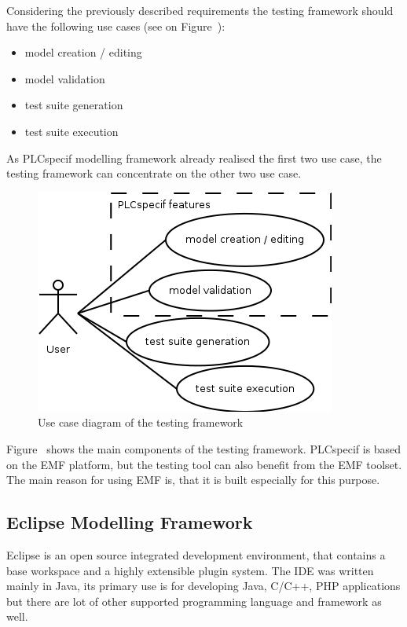 Considering the previously described requirements the testing framework should have the following use cases (see on Figure~\cite{fig:designuc}):

\begin{itemize}
	\item model creation / editing
	\item model validation
	\item test suite generation
	\item test suite execution
\end{itemize}

As PLCspecif modelling framework already realised the first two use case, the testing framework can concentrate on the other two use case.

\begin{figure}[htp]
\centering
\includegraphics[scale=0.6]{figures/design_uc.png}
\caption{Use case diagram of the testing framework}
\label{fig:designuc}
\end{figure}

Figure~\cite{fig:designcomponents} shows the main components of the testing framework. PLCspecif is based on the EMF platform, but the testing tool can also benefit from the EMF toolset. The main reason for using EMF is, that it is built especially for this purpose.

\subsection{Eclipse Modelling Framework}
\label{sub:emf}

Eclipse is an open source integrated development environment, that contains a base workspace and a highly extensible plugin system. The IDE was written mainly in Java, its primary use is for developing Java, C/C++, PHP applications but there are lot of other supported programming language and framework as well.

